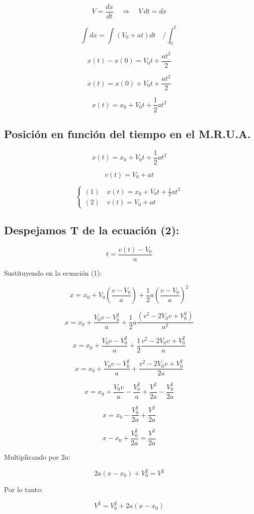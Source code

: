 \[
V = \frac{dx}{dt} \quad \Rightarrow \quad V \, dt = dx
\]

\[
\int dx = \int \left( V_0 + a t \right) dt \quad \Big/ \int_{0}^{t}
\]

\[
x(t) - x(0) = V_0 t + \frac{a t^2}{2}
\]

\[
x(t) = x(0) + V_0 t + \frac{a t^2}{2}
\]

\[
\boxed{x(t) = x_0 + V_0 t + \frac{1}{2} a t^2}
\]

\subsection{Posición en función del tiempo en el M.R.U.A.}

\[
x(t) = x_0 + V_0 t + \frac{1}{2} a t^2
\]

\[
v(t) = V_0 + a t
\]

\[
\begin{cases}
    (1) \quad x(t) = x_0 + V_0 t + \frac{1}{2} a t^2 \\
    (2) \quad v(t) = V_0 + a t
\end{cases}
\]
\subsection{Despejamos T de la ecuación (2):}

\[
t = \frac{v(t) - V_0}{a}
\]

Sustituyendo en la ecuación (1):

\[
x = x_0 + V_0 \left( \frac{v - V_0}{a} \right) + \frac{1}{2} a \left( \frac{v - V_0}{a} \right)^2
\]

\[
x = x_0 + \frac{V_0 v - V_0^2}{a} + \frac{1}{2} a \frac{\left( v^2 - 2 V_0 v + V_0^2 \right)}{a^2}
\]

\[
x = x_0 + \frac{V_0 v - V_0^2}{a} + \frac{1}{2} \frac{v^2 - 2 V_0 v + V_0^2}{a}
\]

\[
x = x_0 + \frac{V_0 v - V_0^2}{a} + \frac{v^2 - 2 V_0 v + V_0^2}{2a}
\]

\[
x = x_0 + \frac{V_0 v}{a} - \frac{V_0^2}{a} + \frac{V^2}{2a} - \frac{V_0^2}{2a}
\]

\[
x = x_0 - \frac{V_0^2}{2a} + \frac{V^2}{2a}
\]

\[
x - x_0 + \frac{V_0^2}{2a} = \frac{V^2}{2a}
\]

Multiplicando por $2a$:

\[
2a(x - x_0) + V_0^2 = V^2
\]

Por lo tanto:

\[
\boxed{V^2 = V_0^2 + 2a(x - x_0)}
\]
